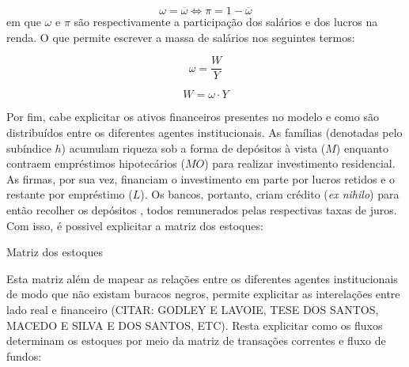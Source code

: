 \begin{equation}
    \omega = \overline{\omega} \Leftrightarrow \pi = 1 - \overline{\omega}
\end{equation}
em que $\omega$ e $\pi$ são respectivamente a participação dos salários e dos lucros na renda. O que permite escrever a massa de salários nos seguintes termos:

$$
\omega = \frac{W}{Y}
$$

\begin{equation}
    W = \omega\cdot Y
\end{equation}

Por fim, cabe explicitar os ativos financeiros presentes no modelo e como são distribuídos entre os diferentes agentes institucionais. As famílias (denotadas pelo subíndice $h$) acumulam riqueza sob a forma de depósitos à vista ($M$) enquanto contraem empréstimos hipotecários ($MO$) para realizar investimento residencial. As firmas, por sua vez, financiam o investimento em parte por lucros retidos e o restante por empréstimo ($L$). Os bancos, portanto, criam crédito (\textit{ex nihilo}) para então recolher os depósitos , todos remunerados pelas respectivas taxas de juros. Com isso, é possivel explicitar a matriz dos estoques:


\begin{table}[H]
\centering
\caption{Matriz dos estoques}
\caption*{\textbf{Fonte:} Elaboração própria}
\end{table}

Esta matriz além de mapear as relações entre os diferentes agentes institucionais de modo que não existam buracos negros, permite explicitar as interelações entre lado real e financeiro (CITAR: GODLEY E LAVOIE, TESE DOS SANTOS, MACEDO E SILVA E DOS SANTOS, ETC). Resta explicitar como os fluxos determinam os estoques por meio da matriz de transações correntes e fluxo de fundos:

